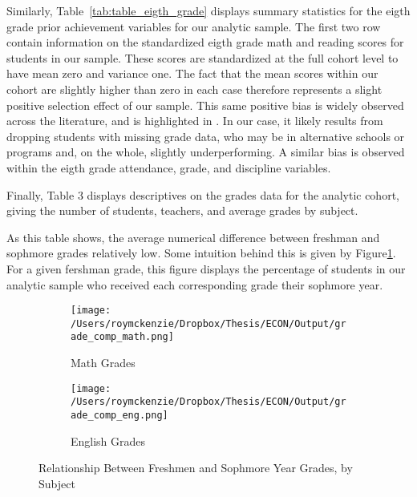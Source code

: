 \documentclass[../thesis_main.tex]{subfiles}
\begin{document}



Similarly, Table~\ref{tab:table_eigth_grade} displays summary statistics for the eigth grade prior achievement variables for our analytic sample. The first two row contain information on the standardized eigth grade math and reading scores for students in our sample. These scores are standardized at the full cohort level to have mean zero and variance one. The fact that the mean scores within our cohort are slightly higher than zero in each case therefore represents a slight positive selection effect of our sample. This same positive bias is widely observed across the literature, and is highlighted in \cite{gilraineMakingTeachingLast2020}. In our case, it likely results from dropping students with missing grade data, who may be in alternative schools or programs and, on the whole, slightly underperforming. A similar bias is observed within the eigth grade attendance, grade, and discipline variables.




Finally, Table 3 displays descriptives on the grades data for the analytic cohort, giving the number of students, teachers, and average grades by subject. %

As this table shows, the average numerical difference between freshman and sophmore grades relatively low. Some intuition behind this is given by Figure\ref{fig:grade_comp}. For a given fershman grade, this figure displays the percentage of students in our analytic sample who received each corresponding grade their sophmore year. 


\begin{figure}[H]
	\centering
	\begin{subfigure}[b]{0.49\textwidth}
		\centering
		\texttt{[image: /Users/roymckenzie/Dropbox/Thesis/ECON/Output/grade\_comp\_math.png]}
		\caption{Math Grades}
	\end{subfigure}
	\hfill
	\begin{subfigure}[b]{0.49\textwidth}
		\centering
		\texttt{[image: /Users/roymckenzie/Dropbox/Thesis/ECON/Output/grade\_comp\_eng.png]}
		\caption{English Grades}
	\end{subfigure}
	\caption{Relationship Between Freshmen and Sophmore Year Grades, by Subject}
	\label{fig:grade_comp}
\end{figure}
\end{document}
